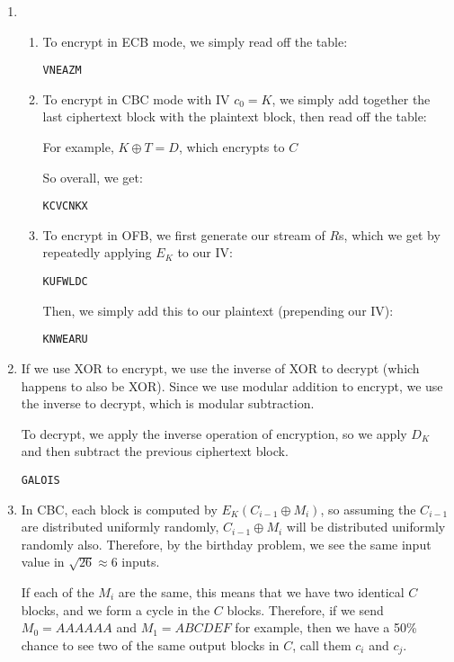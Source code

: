 


\begin{enumerate}[label=(\alph*)]
  \item
    \begin{enumerate}[label=(\roman*)]

      \item
        To encrypt in ECB mode, we simply read off the table:

        \texttt{VNEAZM}

      \item
        To encrypt in CBC mode with IV $c_0 = K$, we simply add together the last ciphertext block with the plaintext block, then read off the table:

        For example, $K \oplus T = D$, which encrypts to $C$

        So overall, we get:

        \texttt{KCVCNKX}

      \item
        To encrypt in OFB, we first generate our stream of $R$s, which we get by repeatedly applying $E_K$ to our IV:

        \texttt{KUFWLDC}

        Then, we simply add this to our plaintext (prepending our IV):

        \texttt{KNWEARU}

        
    \end{enumerate}

  \item
    If we use XOR to encrypt, we use the inverse of XOR to decrypt (which happens to also be XOR). Since we use modular addition to encrypt, we use the inverse to decrypt, which is modular subtraction.

    To decrypt, we apply the inverse operation of encryption, so we apply $D_K$ and then subtract the previous ciphertext block.

    \texttt{GALOIS}

  \item
    In CBC, each block is computed by $E_K(C_{i-1} \oplus M_i)$, so assuming the $C_{i-1}$ are distributed uniformly randomly, $C_{i-1} \oplus M_i$ will be distributed uniformly randomly also. Therefore, by the birthday problem, we see the same input value in $\sqrt{26} \approx 6$ inputs.

    If each of the $M_i$ are the same, this means that we have two identical $C$ blocks, and we form a cycle in the $C$ blocks. Therefore, if we send $M_0 = AAAAAA$ and $M_1 = ABCDEF$ for example, then we have a 50\% chance to see two of the same output blocks in $C$, call them $c_i$ and $c_j$.


\end{enumerate}

